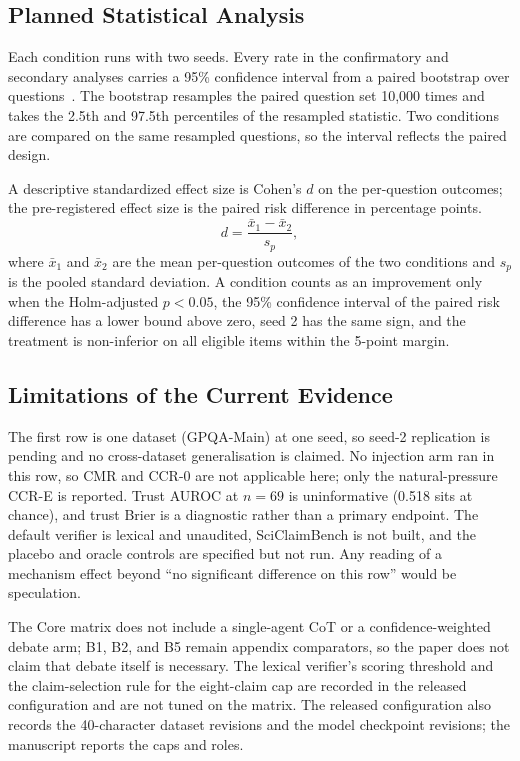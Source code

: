 \documentclass[a4paper,fleqn]{cas-sc}
\begin{document}
\subsection{Planned Statistical Analysis}

Each condition runs with two seeds. Every rate in the confirmatory and secondary analyses carries a 95\% confidence interval from a paired bootstrap over questions~\cite{koehn2004statistical}. The bootstrap resamples the paired question set 10{,}000 times and takes the 2.5th and 97.5th percentiles of the resampled statistic. Two conditions are compared on the same resampled questions, so the interval reflects the paired design.

A descriptive standardized effect size is Cohen's $d$ on the per-question outcomes; the pre-registered effect size is the paired risk difference in percentage points.
\begin{equation}\label{eq:cohend}
  d = \frac{\bar{x}_1 - \bar{x}_2}{s_p},
\end{equation}
where $\bar{x}_1$ and $\bar{x}_2$ are the mean per-question outcomes of the two conditions and $s_p$ is the pooled standard deviation. A condition counts as an improvement only when the Holm-adjusted $p<0.05$, the 95\% confidence interval of the paired risk difference has a lower bound above zero, seed 2 has the same sign, and the treatment is non-inferior on all eligible items within the 5-point margin.

\subsection{Limitations of the Current Evidence}

The first row is one dataset (GPQA-Main) at one seed, so seed-2 replication is pending and no cross-dataset generalisation is claimed. No injection arm ran in this row, so CMR and CCR-0 are not applicable here; only the natural-pressure CCR-E is reported. Trust AUROC at $n=69$ is uninformative (0.518 sits at chance), and trust Brier is a diagnostic rather than a primary endpoint. The default verifier is lexical and unaudited, SciClaimBench is not built, and the placebo and oracle controls are specified but not run. Any reading of a mechanism effect beyond ``no significant difference on this row'' would be speculation.

The Core matrix does not include a single-agent CoT or a confidence-weighted debate arm; B1, B2, and B5 remain appendix comparators, so the paper does not claim that debate itself is necessary. The lexical verifier's scoring threshold and the claim-selection rule for the eight-claim cap are recorded in the released configuration and are not tuned on the matrix. The released configuration also records the 40-character dataset revisions and the model checkpoint revisions; the manuscript reports the caps and roles.
\end{document}
